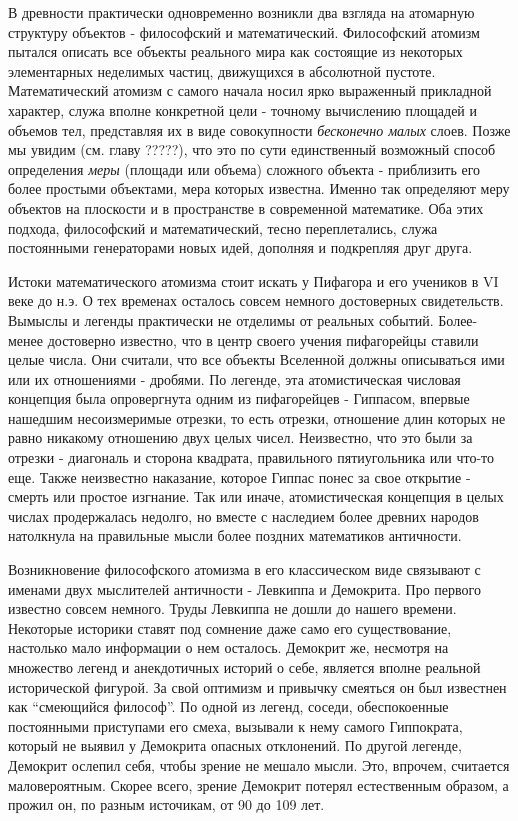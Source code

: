 В древности практически одновременно возникли два взгляда на атомарную структуру объектов - философский и математический.
Философский атомизм пытался описать все объекты реального мира как состоящие из некоторых элементарных неделимых частиц, движущихся в абсолютной пустоте.
Математический атомизм с самого начала носил ярко выраженный прикладной характер, служа вполне конкретной цели - точному вычислению площадей и объемов тел, представляя их в виде совокупности \textit{бесконечно малых} слоев.
Позже мы увидим (см. главу ?????), что это по сути единственный возможный способ определения \textit{меры} (площади или объема) сложного объекта - приблизить его более простыми объектами, мера которых известна.
Именно так определяют меру объектов на плоскости и в пространстве в современной математике.
Оба этих подхода, философский и математический, тесно переплетались, служа постоянными генераторами новых идей, дополняя и подкрепляя друг друга.

Истоки математического атомизма стоит искать у Пифагора и его учеников в VI веке до н.э. 
О тех временах осталось совсем немного достоверных свидетельств.
Вымыслы и легенды практически не отделимы от реальных событий.
Более-менее достоверно известно, что в центр своего учения пифагорейцы ставили целые числа.
Они считали, что все объекты Вселенной должны описываться ими или их отношениями - дробями.
По легенде, эта атомистическая числовая концепция была опровергнута одним из пифагорейцев - Гиппасом, впервые нашедшим несоизмеримые отрезки, то есть отрезки, отношение длин которых не равно никакому отношению двух целых чисел.
Неизвестно, что это были за отрезки - диагональ и сторона квадрата, правильного пятиугольника или что-то еще.
Также неизвестно наказание, которое Гиппас понес за свое открытие - смерть или простое изгнание.   
Так или иначе, атомистическая концепция в целых числах продержалась недолго, но вместе с наследием более древних народов натолкнула на правильные мысли более поздних математиков античности.

Возникновение философского атомизма в его классическом виде связывают с именами двух мыслителей античности - Левкиппа и Демокрита.
Про первого известно совсем немного.
Труды Левкиппа не дошли до нашего времени.
Некоторые историки ставят под сомнение даже само его существование, настолько мало информации о нем осталось.
Демокрит же, несмотря на множество легенд и анекдотичных историй о себе, является вполне реальной исторической фигурой. 
За свой оптимизм и привычку смеяться он был известнен как ``смеющийся философ''.
По одной из легенд, соседи, обеспокоенные постоянными приступами его смеха, вызывали к нему самого Гиппократа, который не выявил у Демокрита опасных отклонений.
По другой легенде, Демокрит ослепил себя, чтобы зрение не мешало мысли. 
Это, впрочем, считается маловероятным.
Скорее всего, зрение Демокрит потерял естественным образом, а прожил он, по разным источикам, от 90 до 109 лет.

